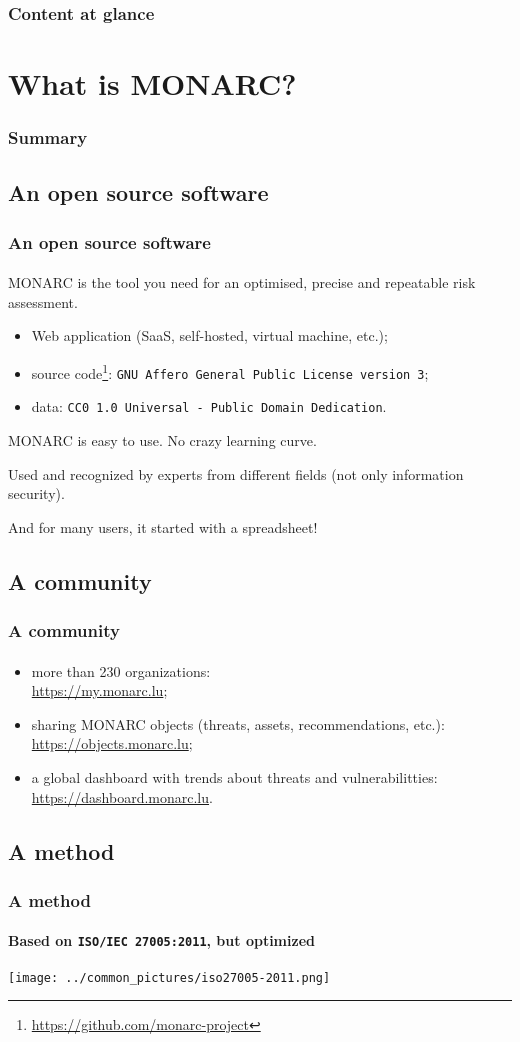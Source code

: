 \setcounter{tocdepth}{1}
\begin{frame}
  \frametitle{Content at glance}
  \tableofcontents
\end{frame}
\setcounter{tocdepth}{4}

%
%
\section{What is MONARC?}
\begin{frame}
  \frametitle{Summary}
\end{frame}
\subsection{An open source software}
\begin{frame}
  \frametitle{An open source software}
  \framesubtitle{}
  MONARC is the tool you need for an optimised, precise and repeatable risk assessment.

  \bigskip
  \begin{itemize}
    \item Web application (SaaS, self-hosted, virtual machine, etc.);
    \item source code\footnote{\url{https://github.com/monarc-project}}:
    \texttt{GNU Affero General Public License version 3};
    \item data: \texttt{CC0 1.0 Universal - Public Domain Dedication}.
  \end{itemize}

  \bigskip
  MONARC is easy to use. No crazy learning curve.

  Used and recognized by experts from different fields (not only information security).

  \bigskip
  And for many users, it started with a spreadsheet!
\end{frame}

\subsection{A community}
\begin{frame}
  \frametitle{A community}
  \framesubtitle{}
  \begin{itemize}
    \item more than 230 organizations:\\ \url{https://my.monarc.lu};
    \item sharing MONARC objects (threats, assets, recommendations, etc.):\\
    \url{https://objects.monarc.lu};
    \item a global dashboard with trends about threats and vulnerabilitties:\\
    \url{https://dashboard.monarc.lu}.
  \end{itemize}
\end{frame}

\subsection{A method}
\begin{frame}
  \frametitle{A method}
  \framesubtitle{Based on \texttt{ISO/IEC 27005:2011}, but optimized}
  \begin{center}
    \texttt{[image: ../common\_pictures/iso27005-2011.png]}
  \end{center}
\end{frame}
